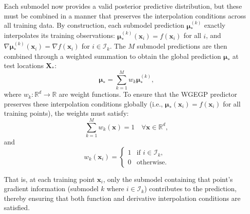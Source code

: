 \documentclass[12pt]{article}
\begin{document}
Each submodel now provides a valid posterior predictive distribution, but these must be combined in a manner that preserves the interpolation conditions across all training data. By construction, each submodel prediction $\boldsymbol{\mu}_*^{(k)}$ exactly interpolates its training observations: $\boldsymbol{\mu}_*^{(k)}(\mathbf{x}_i) = f(\mathbf{x}_i)$ for all $i$, and $\nabla \boldsymbol{\mu}_*^{(k)}(\mathbf{x}_i) = \nabla f(\mathbf{x}_i)$ for $i \in \mathcal{I}_k$. The $M$ submodel predictions are then combined through a weighted summation to obtain the global prediction $\boldsymbol{\mu}_*$ at test locations $\mathbf{X}_*$:
\begin{equation}
	\label{eqn:wgek_weighted_prediction}
	\boldsymbol{\mu}_* = \sum_{k=1}^{M} w_k \boldsymbol{\mu}_*^{(k)},
\end{equation}
where $w_k: \mathbb{R}^d \to \mathbb{R}$ are weight functions. To ensure that the WGEGP predictor preserves these interpolation conditions globally (i.e., $\boldsymbol{\mu}_*(\mathbf{x}_i) = f(\mathbf{x}_i)$ for all training points), the weights must satisfy:
\begin{equation}
	\label{eqn:wgek_weight_constraints}
	\sum_{k=1}^{M} w_k(\mathbf{x}) = 1 \quad \forall \mathbf{x} \in \mathbb{R}^d,
\end{equation}
and
\begin{equation}
	w_k(\mathbf{x}_i) = \begin{cases}
		1 & \text{if } i \in \mathcal{I}_k, \\
		0 & \text{otherwise}.
	\end{cases}
\end{equation}

That is, at each training point $\mathbf{x}_i$, only the submodel containing that point's gradient information (submodel $k$ where $i \in \mathcal{I}_k$) contributes to the prediction, thereby ensuring that both function and derivative interpolation conditions are satisfied.
\end{document}
